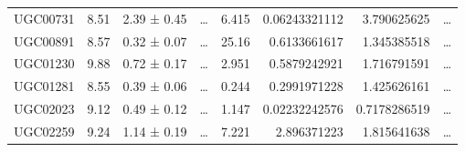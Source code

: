\documentclass[reprint,%
 amsmath,amssymb,
 aps,
]{revtex4-1}
\begin{document}
\begin{table}[]
\begin{tabular}{cccccrrc}
\rowcolor[HTML]{F3F3F3} 
UGC00731             & 8.51                      & 2.39 ± 0.45           & …                      & 6.415                                                        & 0.06243321112                                                         & 3.790625625                                                           & …                                                             \\
\rowcolor[HTML]{F3F3F3} 
UGC00891             & 8.57                      & 0.32 ± 0.07           & …                      & 25.16                                                        & 0.6133661617                                                          & 1.345385518                                                           & …                                                             \\
\rowcolor[HTML]{F3F3F3} 
UGC01230             & 9.88                      & 0.72 ± 0.17           & …                      & 2.951                                                        & 0.5879242921                                                          & 1.716791591                                                           & …                                                             \\
\rowcolor[HTML]{F3F3F3} 
UGC01281             & 8.55                      & 0.39 ± 0.06           & …                      & 0.244                                                        & 0.2991971228                                                          & 1.425626161                                                           & …                                                             \\
\rowcolor[HTML]{F3F3F3} 
UGC02023             & 9.12                      & 0.49 ± 0.12           & …                      & 1.147                                                        & 0.02232242576                                                         & 0.7178286519                                                          & …                                                             \\
\rowcolor[HTML]{F3F3F3} 
UGC02259             & 9.24                      & 1.14 ± 0.19           & …                      & 7.221                                                        & 2.896371223                                                           & 1.815641638                                                           & …                                                             \\

\end{tabular}
\end{table}
\end{document}
